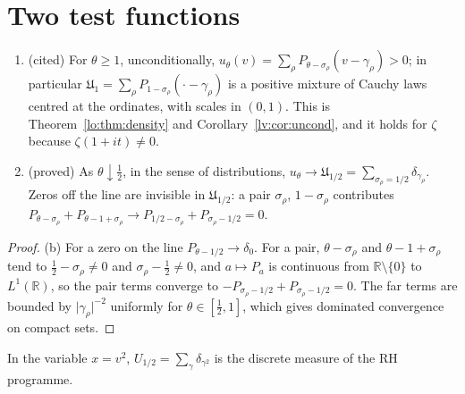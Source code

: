 \section{Two test functions}\label{cf:sec:test}

\begin{proposition}\label{cf:prop:ends}
\begin{enumerate}
\item[(a)] (cited) For $\theta\ge1$, unconditionally, $u_\theta(v)=\sum_\rho P_{\theta-\sigma_\rho}(v-\gamma_\rho)>0$; in particular $\mathfrak U_1=\sum_\rho P_{1-\sigma_\rho}(\cdot-\gamma_\rho)$ is a positive mixture of Cauchy laws centred at the ordinates, with scales in $(0,1)$. This is Theorem~\ref{lo:thm:density} and Corollary~\ref{lv:cor:uncond}, and it holds for $\zeta$ because $\zeta(1+it)\ne0$.
\item[(b)] (proved) As $\theta\downarrow\frac12$, in the sense of distributions, $u_\theta\to\mathfrak U_{1/2}=\sum_{\sigma_\rho=1/2}\delta_{\gamma_\rho}$. Zeros off the line are invisible in $\mathfrak U_{1/2}$: a pair $\sigma_\rho$, $1-\sigma_\rho$ contributes $P_{\theta-\sigma_\rho}+P_{\theta-1+\sigma_\rho}\to P_{1/2-\sigma_\rho}+P_{\sigma_\rho-1/2}=0$.
\end{enumerate}
\end{proposition}

\begin{proof}
(b) For a zero on the line $P_{\theta-1/2}\to\delta_0$. For a pair, $\theta-\sigma_\rho$ and $\theta-1+\sigma_\rho$ tend to $\frac12-\sigma_\rho\ne0$ and $\sigma_\rho-\frac12\ne0$, and $a\mapsto P_a$ is continuous from $\mathbb R\setminus\{0\}$ to $L^1(\mathbb R)$, so the pair terms converge to $-P_{\sigma_\rho-1/2}+P_{\sigma_\rho-1/2}=0$. The far terms are bounded by $\lvert\gamma_\rho\rvert^{-2}$ uniformly for $\theta\in[\frac12,1]$, which gives dominated convergence on compact sets.
\end{proof}

In the variable $x=v^2$, $U_{1/2}=\sum_\gamma\delta_{\gamma^2}$ is the discrete measure of the RH programme.


